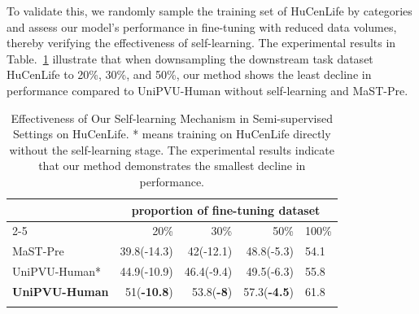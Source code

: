 To validate this, we randomly sample the training set of HuCenLife by categories and assess our model's performance in fine-tuning with reduced data volumes, thereby verifying the effectiveness of self-learning. The experimental results in Table.~\ref{experimant:proportion} illustrate that when downsampling the downstream task dataset HuCenLife to 20\%, 30\%, and 50\%, our method shows the least decline in performance compared to UniPVU-Human without self-learning and MaST-Pre.



\begin{table}\footnotesize
\caption{Effectiveness of Our Self-learning Mechanism in Semi-supervised Settings on HuCenLife. * means training on HuCenLife directly without the self-learning stage. The experimental results indicate that our method demonstrates the smallest decline in performance. }
\begin{tabular}{l|llll}
\Xhline{1px}
\multirow{2}{*}{}    & \multicolumn{4}{c}{proportion of fine-tuning dataset}                                                         \\ \cline{2-5} 
                           & \multicolumn{1}{r|}{20\%} & \multicolumn{1}{r|}{30\%} & \multicolumn{1}{r|}{50\%} & \multicolumn{1}{r}{100\%} \\ \hline
MaST-Pre~\cite{shen2023masked}& \multicolumn{1}{r|}{39.8(-14.3)}     & \multicolumn{1}{r|}{42(-12.1)}     & \multicolumn{1}{r|}{48.8(-5.3)}     &                            54.1
\\ \hline
UniPVU-Human*& \multicolumn{1}{r|}{44.9(-10.9)}     & \multicolumn{1}{r|}{46.4(-9.4)}     & \multicolumn{1}{r|}{49.5(-6.3)}     &                            55.8
\\ \hline
\textbf{UniPVU-Human}& \multicolumn{1}{r|}{51(\textbf{-10.8})} & \multicolumn{1}{r|}{53.8(\textbf{-8})} & \multicolumn{1}{r|}{57.3(\textbf{-4.5})} & \multicolumn{1}{l}{61.8}  \\ \Xhline{1px}
\end{tabular}
\label{experimant:proportion}
\end{table}